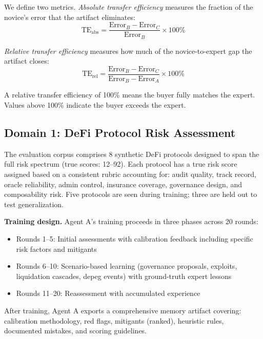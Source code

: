 \documentclass[11pt]{article}
\begin{document}
We define two metrics. \textit{Absolute transfer efficiency} measures the fraction of the novice's error that the artifact eliminates:
\begin{equation}
  \text{TE}_{\text{abs}} = \frac{\text{Error}_B - \text{Error}_C}{\text{Error}_B} \times 100\%
\end{equation}

\textit{Relative transfer efficiency} measures how much of the novice-to-expert gap the artifact closes:
\begin{equation}
  \text{TE}_{\text{rel}} = \frac{\text{Error}_B - \text{Error}_C}{\text{Error}_B - \text{Error}_A} \times 100\%
  \label{eq:te_rel}
\end{equation}

A relative transfer efficiency of 100\% means the buyer fully matches the expert. Values above 100\% indicate the buyer exceeds the expert.

\subsection{Domain 1: DeFi Protocol Risk Assessment}

The evaluation corpus comprises 8 synthetic DeFi protocols designed to span the full risk spectrum (true scores: 12--92). Each protocol has a true risk score assigned based on a consistent rubric accounting for: audit quality, track record, oracle reliability, admin control, insurance coverage, governance design, and composability risk. Five protocols are seen during training; three are held out to test generalization.

\textbf{Training design.} Agent A's training proceeds in three phases across 20 rounds:
\begin{itemize}[leftmargin=2em]
  \item Rounds 1--5: Initial assessments with calibration feedback including specific risk factors and mitigants
  \item Rounds 6--10: Scenario-based learning (governance proposals, exploits, liquidation cascades, depeg events) with ground-truth expert lessons
  \item Rounds 11--20: Reassessment with accumulated experience
\end{itemize}

After training, Agent A exports a comprehensive memory artifact covering: calibration methodology, red flags, mitigants (ranked), heuristic rules, documented mistakes, and scoring guidelines.
\end{document}
